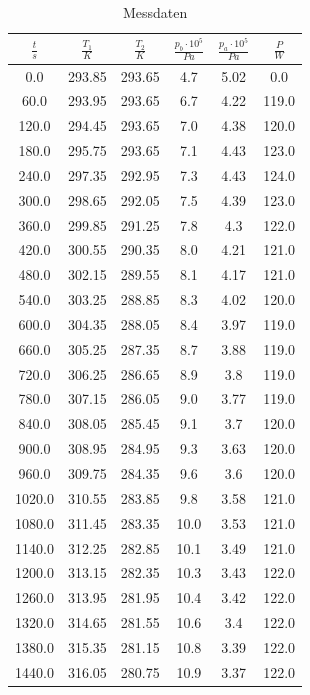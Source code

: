 \begin{table}
  \centering
  \caption{Messdaten}

  \label{tab:Messdaten}
\begin{tabular}{cccccc}
\toprule
$\frac{t}{s}$ & $\frac{T_1}{K}$ & $\frac{T_2}{K}$& $\frac{p_b\cdot10^5}{Pa}$ & $\frac{p_a\cdot10^5}{Pa}$ & $\frac{P}{W}$ \\
\midrule
0.0 & 293.85 & 293.65 & 4.7 & 5.02 & 0.0 \\
60.0 & 293.95 & 293.65 & 6.7 & 4.22 & 119.0 \\
120.0 & 294.45 & 293.65 & 7.0 & 4.38 & 120.0 \\
180.0 & 295.75 & 293.65 & 7.1 & 4.43 & 123.0 \\
240.0 & 297.35 & 292.95 & 7.3 & 4.43 & 124.0 \\
300.0 & 298.65 & 292.05 & 7.5 & 4.39 & 123.0 \\
360.0 & 299.85 & 291.25 & 7.8 & 4.3 & 122.0 \\
420.0 & 300.55 & 290.35 & 8.0 & 4.21 & 121.0 \\
480.0 & 302.15 & 289.55 & 8.1 & 4.17 & 121.0 \\
540.0 & 303.25 & 288.85 & 8.3 & 4.02 & 120.0 \\
600.0 & 304.35 & 288.05 & 8.4 & 3.97 & 119.0 \\
660.0 & 305.25 & 287.35 & 8.7 & 3.88 & 119.0 \\
720.0 & 306.25 & 286.65 & 8.9 & 3.8 & 119.0 \\
780.0 & 307.15 & 286.05 & 9.0 & 3.77 & 119.0 \\
840.0 & 308.05 & 285.45 & 9.1 & 3.7 & 120.0 \\
900.0 & 308.95 & 284.95 & 9.3 & 3.63 & 120.0 \\
960.0 & 309.75 & 284.35 & 9.6 & 3.6 & 120.0 \\
1020.0 & 310.55 & 283.85 & 9.8 & 3.58 & 121.0 \\
1080.0 & 311.45 & 283.35 & 10.0 & 3.53 & 121.0 \\
1140.0 & 312.25 & 282.85 & 10.1 & 3.49 & 121.0 \\
1200.0 & 313.15 & 282.35 & 10.3 & 3.43 & 122.0 \\
1260.0 & 313.95 & 281.95 & 10.4 & 3.42 & 122.0 \\
1320.0 & 314.65 & 281.55 & 10.6 & 3.4 & 122.0 \\
1380.0 & 315.35 & 281.15 & 10.8 & 3.39 & 122.0 \\
1440.0 & 316.05 & 280.75 & 10.9 & 3.37 & 122.0 \\

\end{tabular}
\end{table}
